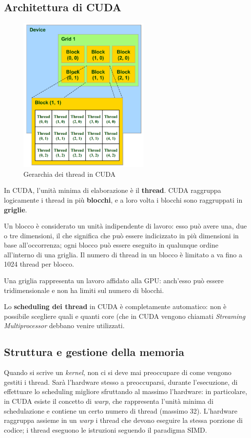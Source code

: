 \documentclass[12pt,a4paper,openright,twoside]{report}
\begin{document}
\subsection{Architettura di CUDA}

\begin{figure}[h]
\centering{}
\includegraphics[width=6.5cm]{grids-and-blocks.png}
\caption{Gerarchia dei thread in CUDA}
\label{img:grids-and-blocks}
\end{figure}

In CUDA, l'unità minima di elaborazione è il \textbf{thread}. CUDA raggruppa logicamente i thread in più \textbf{blocchi}, e a loro volta i blocchi sono raggruppati in \textbf{griglie}.

Un blocco è considerato un unità indipendente di lavoro: esso può avere una, due o tre dimensioni, il che significa che può essere indicizzato in più dimensioni in base all'occorrenza; ogni blocco può essere eseguito in qualunque ordine all'interno di una griglia. Il numero di thread in un blocco è limitato a va fino a 1024 thread per blocco.

Una griglia rappresenta un lavoro affidato alla GPU: anch'esso può essere tridimensionale e non ha limiti sul numero di blocchi.

Lo \textbf{scheduling dei thread} in CUDA è completamente automatico: non è possibile scegliere quali e quanti core (che in CUDA vengono chiamati \textit{Streaming Multiprocessor} debbano venire utilizzati.

\subsection{Struttura e gestione della memoria}

Quando si scrive un \textit{kernel}, non ci si deve mai preoccupare di come vengono gestiti i thread. Sarà l'hardware stesso a preoccuparsi, durante l'esecuzione, di effettuare lo scheduling migliore sfruttando al massimo l'hardware: in particolare, in CUDA esiste il concetto di \textit{warp}, che rappresenta l'unità minima di schedulazione e contiene un certo numero di thread (massimo 32). L'hardware raggruppa assieme in un \textit{warp} i thread che devono eseguire la stessa porzione di codice; i thread eseguono le istruzioni seguendo il paradigma SIMD.
\end{document}
